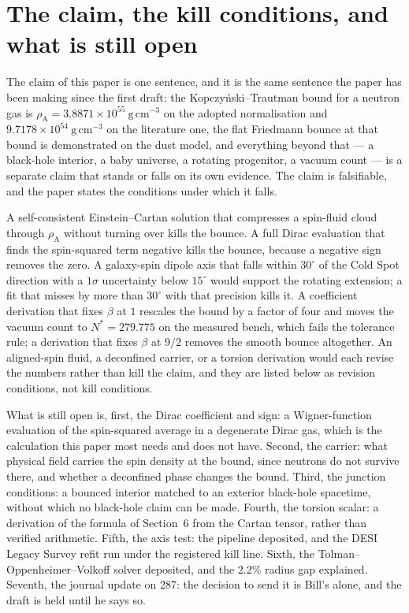 \documentclass[11pt]{article}
\newcommand{\rhoA}{\rho_{\mathrm{A}}}
\begin{document}
\section{The claim, the kill conditions, and what is still open}

The claim of this paper is one sentence, and it is the same sentence
the paper has been making since the first draft: the
Kopczy\'nski--Trautman bound for a neutron gas is
$\rhoA = 3.8871\times10^{55}\ \mathrm{g\,cm^{-3}}$ on the adopted
normalisation and $9.7178\times10^{54}\ \mathrm{g\,cm^{-3}}$ on the
literature one, the flat Friedmann bounce at that bound is demonstrated
on the dust model,
and everything beyond that --- a black-hole interior, a baby universe, a
rotating progenitor, a vacuum count --- is a separate claim that stands
or falls on its own evidence. The claim is falsifiable, and the paper
states the conditions under which it falls.

A self-consistent Einstein--Cartan solution that compresses a spin-fluid
cloud through $\rhoA$ without turning over kills the bounce. A full
Dirac evaluation that finds the spin-squared term negative kills the
bounce, because a negative sign removes the zero. A galaxy-spin dipole
axis that falls within $30^\circ$ of the Cold Spot direction with a
$1\sigma$ uncertainty below $15^\circ$ would support the rotating
extension; a fit that misses by more than $30^\circ$ with that precision
kills it. A coefficient derivation that fixes $\beta$ at $1$ rescales
the bound by a factor of four and moves the vacuum count to $N^* =
279.775$ on the measured bench, which fails the tolerance rule; a
derivation that fixes $\beta$ at $9/2$ removes the smooth bounce
altogether. An aligned-spin fluid, a deconfined carrier, or a torsion
derivation would each revise the numbers rather than kill the claim, and
they are listed below as revision conditions, not kill conditions.

What is still open is, first, the Dirac coefficient and sign: a
Wigner-function evaluation of the spin-squared average in a degenerate
Dirac gas, which is the calculation this paper most needs and does not
have. Second, the carrier: what physical field carries the spin density
at the bound, since neutrons do not survive there, and whether a
deconfined phase changes the bound. Third, the junction conditions: a
bounced interior matched to an exterior black-hole spacetime, without
which no black-hole claim can be made. Fourth, the torsion scalar: a
derivation of the formula of Section~6 from the Cartan tensor, rather
than verified arithmetic. Fifth, the axis test: the pipeline deposited,
and the DESI Legacy Survey refit run under the registered kill line.
Sixth, the Tolman--Oppenheimer--Volkoff solver deposited, and the $2.2\%$
radius gap explained. Seventh, the journal update on 287: the decision
to send it is Bill's alone, and the draft is held until he says so.
\end{document}
